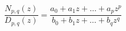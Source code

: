 \[\frac{N_{p,q}(z)}{D_{p,q}(z)}=\frac{a_{0}+a_{1}z+\dots+a_{p}z^{p}}{b_{0}+b_{1}%
z+\dots+b_{q}z^{q}}\]